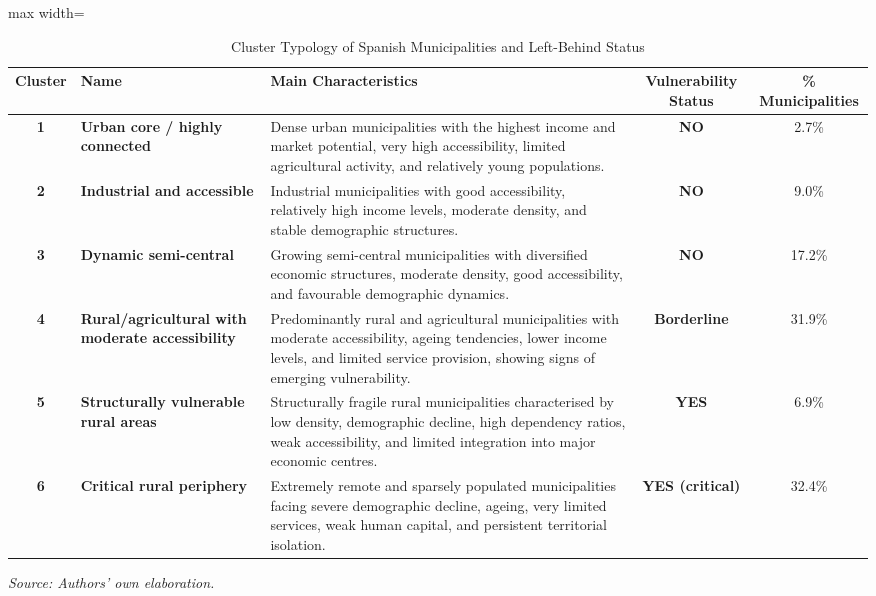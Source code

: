 \documentclass[a4paper,11pt,oneside]{article}
\begin{document}
\clearpage
\pagebreak













\clearpage
\pagebreak
\begin{table}[ht]
\centering
\caption{Cluster Typology of Spanish Municipalities and Left-Behind Status}
\label{tbl:5}

\small

\begin{adjustbox}{max width=\textwidth}
\begin{tabular}{clp{8cm}cc}
\toprule
\textbf{Cluster} & \textbf{Name} & \textbf{Main Characteristics} & \textbf{Vulnerability Status} & \textbf{\% Municipalities} \\
\midrule

\textbf{1} & \textbf{Urban core / highly connected}
& Dense urban municipalities with the highest income and market potential, very high accessibility, limited agricultural activity, and relatively young populations.
& \textbf{NO}
& 2.7\% \\

\textbf{2} & \textbf{Industrial and accessible}
& Industrial municipalities with good accessibility, relatively high income levels, moderate density, and stable demographic structures.
& \textbf{NO}
& 9.0\% \\

\textbf{3} & \textbf{Dynamic semi-central}
& Growing semi-central municipalities with diversified economic structures, moderate density, good accessibility, and favourable demographic dynamics.
& \textbf{NO}
& 17.2\% \\

\textbf{4} & \textbf{Rural/agricultural with moderate accessibility}
& Predominantly rural and agricultural municipalities with moderate accessibility, ageing tendencies, lower income levels, and limited service provision, showing signs of emerging vulnerability.
& \textbf{Borderline}
& 31.9\% \\

\textbf{5} & \textbf{Structurally vulnerable rural areas}
& Structurally fragile rural municipalities characterised by low density, demographic decline, high dependency ratios, weak accessibility, and limited integration into major economic centres.
& \textbf{YES}
& 6.9\% \\

\textbf{6} & \textbf{Critical rural periphery}
& Extremely remote and sparsely populated municipalities facing severe demographic decline, ageing, very limited services, weak human capital, and persistent territorial isolation.
& \textbf{YES (critical)}
& 32.4\% \\

\bottomrule
\end{tabular}
\end{adjustbox}

\smallskip
\textit{Source: Authors' own elaboration.}

\end{table}
\end{document}
